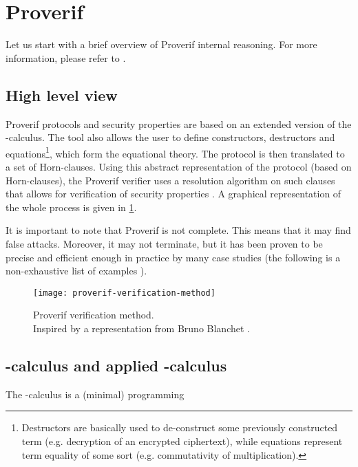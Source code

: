 \section{Proverif}
Let us start with a brief overview of Proverif internal reasoning. For more information, please refer to \cite{SymbolicComputationalBlanchet, SymbolicVerificationBlanchet, ProverifManual}.

\subsection{High level view}
Proverif protocols and security properties are based on an extended version of the \textpi-calculus. The tool also allows the user to define constructors, destructors and equations\footnote{Destructors are basically used to de-construct some previously constructed term (e.g. decryption of an encrypted ciphertext), while equations represent term equality of some sort (e.g. commutativity of multiplication).}, which form the equational theory. The protocol is then translated to a set of Horn-clauses. Using this abstract representation of the protocol (based on Horn-clauses), the Proverif verifier uses a resolution algorithm on such clauses that allows for verification of security properties \cite{SymbolicComputationalBlanchet}.
A graphical representation of the whole process is given in \cref{fig:proverif-verification-method}.

It is important to note that Proverif is not complete. This means that it may find false attacks. Moreover, it may not terminate, but it has been proven to be precise and efficient enough in practice by many case studies (the following is a non-exhaustive list of examples \cite{10.1145/1266977.1266978, ABADI20053, hal-01575923, DBLP:journals/corr/abs-2012-03141}). 

\begin{figure}[t]
    \texttt{[image: proverif-verification-method]}
    \centering
    \caption{Proverif verification method.\\Inspired by a representation from Bruno Blanchet \cite{SymbolicComputationalBlanchet}.}
    \label{fig:proverif-verification-method}
\end{figure}

\subsection{\textpi-calculus and applied \textpi-calculus}

The \textpi-calculus is a (minimal) programming \cite{pi-calculus-book}

